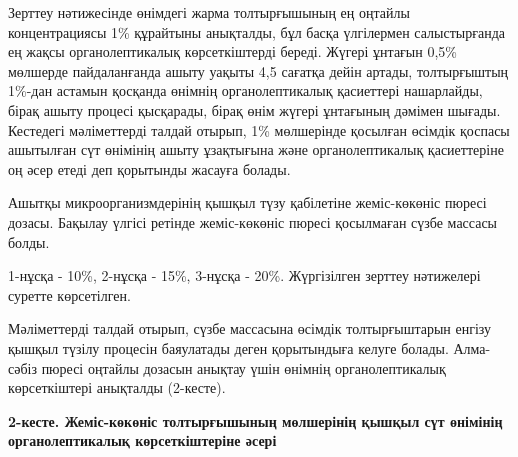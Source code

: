 \begin{multicols}{2}
Зерттеу нәтижесінде өнімдегі жарма толтырғышының ең оңтайлы
концентрациясы 1\% құрайтыны анықталды, бұл басқа үлгілермен
салыстырғанда ең жақсы органолептикалық көрсеткіштерді береді. Жүгері
ұнтағын 0,5\% мөлшерде пайдаланғанда ашыту уақыты 4,5 сағатқа дейін
артады, толтырғыштың 1\%-дан астамын қосқанда өнімнің органолептикалық
қасиеттері нашарлайды, бірақ ашыту процесі қысқарады, бірақ өнім жүгері
ұнтағының дәмімен шығады. Кестедегі мәліметтерді талдай отырып, 1\%
мөлшерінде қосылған өсімдік қоспасы ашытылған сүт өнімінің ашыту
ұзақтығына және органолептикалық қасиеттеріне оң әсер етеді деп
қорытынды жасауға болады.

Ашытқы микроорганизмдерінің қышқыл түзу қабілетіне жеміс-көкөніс пюресі
дозасы. Бақылау үлгісі ретінде жеміс-көкөніс пюресі қосылмаған сүзбе
массасы болды.

1-нұсқа - 10\%, 2-нұсқа - 15\%, 3-нұсқа - 20\%. Жүргізілген зерттеу
нәтижелері суретте көрсетілген.

Мәліметтерді талдай отырып, сүзбе массасына өсімдік толтырғыштарын
енгізу қышқыл түзілу процесін баяулатады деген қорытындыға келуге
болады. Алма-сәбіз пюресі оңтайлы дозасын анықтау үшін өнімнің
органолептикалық көрсеткіштері анықталды (2-кесте).
\end{multicols}

{\bfseries 2-кесте. Жеміс-көкөніс толтырғышының мөлшерінің қышқыл сүт өнімінің органолептикалық көрсеткіштеріне әсері}

